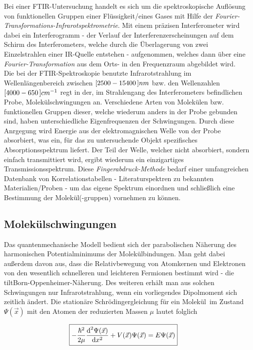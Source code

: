 \documentclass[numbers=noenddot,a4paper,10pt,twocolumn]{article}
\newcommand{\diff}{\textnormal{d}}
\newcommand{\tilt}[1]{\textit{#1}}
\begin{document}
		Bei einer FTIR-Untersuchung handelt es sich um die spektroskopische Aufl\"osung von funktionellen Gruppen einer Fl\"ussigkeit/eines Gases mit Hilfe der \tilt{Fourier-Transformations-Infrarotspektrometrie}. Mit einem pr\"azisen Interferometer wird dabei ein Interferogramm - der Verlauf der Interferenzerscheinungen auf dem Schirm des Interferometers, welche durch die \"Uberlagerung von zwei Einzelstrahlen einer IR-Quelle entstehen - aufgenommen, welches dann \"uber eine \tilt{Fourier-Transformation} aus dem Orts- in den Frequenzraum abgebildet wird.\\
		Die bei der FTIR-Spektroskopie benutzte Infrarotstrahlung im Wellenl\"angenbereich zwischen $\unit[[2500-15400]]{nm}$ bzw. den Wellenzahlen $\unit[[4000-650]]{cm^{-1}}$ regt in der, im Strahlengang des Interferometers befindlichen Probe, Molek\"ulschwingungen an. Verschiedene Arten von Molek\"ulen bzw. funktionellen Gruppen dieser, welche wiederum anders in der Probe gebunden sind, haben unterschiedliche Eigenfrequenzen der Schwingungen. Durch diese Anrgegung wird Energie aus der elektromagnischen Welle von der Probe absorbiert, was ein, f\"ur das zu untersuchende Objekt spezifisches Absorptionsspektrum liefert. Der Teil der Welle, welcher nicht absorbiert, sondern einfach transmittiert wird, ergibt wiederum ein einzigartiges Transmissionsspektrum. Diese \tilt{Fingerabdruck-Methode} bedarf einer umfangreichen Datenbank von Korrelationstabellen - Literaturspektren zu bekannten Materialien/Proben - um das eigene Spektrum einordnen und schlie{\ss}lich eine Bestimmung der Molek\"ul(-gruppen) vornehmen zu k\"onnen.
		
	\subsection{Molek\"ulschwingungen}
	
		Das quantenmechanische Modell bedient sich der parabolischen N\"aherung des harmonischen Potentialminimums der Molek\"ulbindungen. Man geht dabei au{\ss}erdem davon aus, dass die Relativbewegung von Atomkernen und Elektronen von den wesentlich schnelleren und leichteren Fermionen bestimmt wird - die tilt{Born-Oppenheimer-N\"aherung}. Des weiteren erh\"alt man aus solchen Schwingungen nur Infrarotstrahlung, wenn ein vorliegendes Dipolmoment sich zeitlich \"andert. Die station\"are Schr\"odingergleichung f\"ur ein Molek\"ul\ im Zustand $\Psi(\vec{x})$ mit den Atomen der reduzierten Massen $\mu$	lautet folglich \cite{FTIRInfra}
		
			\begin{align}
				\Aboxed{
				-\frac{\hbar^{2}}{2\mu}\frac{\diff^{2}\Psi(\vec{x})}{\diff x^{2}}+V(\vec{x})\Psi(\vec{x})=E\Psi(\vec{x})
				}
				\label{eq:schroed}
			\end{align}
	
\end{document}
